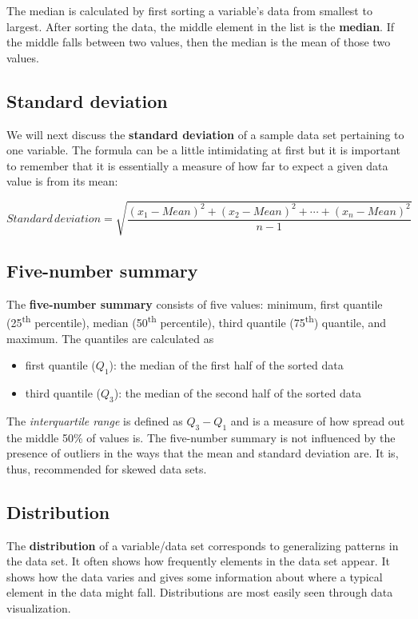 \documentclass[]{tufte-book}
\providecommand{\tightlist}{%
  \setlength{\itemsep}{0pt}\setlength{\parskip}{0pt}}
\begin{document}
The median is calculated by first sorting a variable's data from
smallest to largest. After sorting the data, the middle element in the
list is the \textbf{median}. If the middle falls between two values,
then the median is the mean of those two values.

\subsection{Standard deviation}\label{standard-deviation}

We will next discuss the \textbf{standard deviation} of a sample data
set pertaining to one variable. The formula can be a little intimidating
at first but it is important to remember that it is essentially a
measure of how far to expect a given data value is from its mean:

\[Standard \, deviation = \sqrt{\frac{(x_1 - Mean)^2 + (x_2 - Mean)^2 + \cdots + (x_n - Mean)^2}{n - 1}}\]

\subsection{Five-number summary}\label{five-number-summary}

The \textbf{five-number summary} consists of five values: minimum, first
quantile (25\textsuperscript{th} percentile), median
(50\textsuperscript{th} percentile), third quantile
(75\textsuperscript{th}) quantile, and maximum. The quantiles are
calculated as

\begin{itemize}
\tightlist
\item
  first quantile (\(Q_1\)): the median of the first half of the sorted
  data
\item
  third quantile (\(Q_3\)): the median of the second half of the sorted
  data
\end{itemize}

The \emph{interquartile range} is defined as \(Q_3 - Q_1\) and is a
measure of how spread out the middle 50\% of values is. The five-number
summary is not influenced by the presence of outliers in the ways that
the mean and standard deviation are. It is, thus, recommended for skewed
data sets.

\subsection{Distribution}\label{distribution}

The \textbf{distribution} of a variable/data set corresponds to
generalizing patterns in the data set. It often shows how frequently
elements in the data set appear. It shows how the data varies and gives
some information about where a typical element in the data might fall.
Distributions are most easily seen through data visualization.
\end{document}
